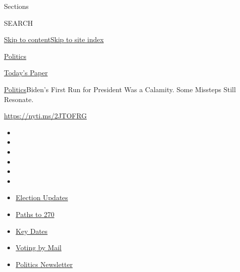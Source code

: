 Sections

SEARCH

\protect\hyperlink{site-content}{Skip to
content}\protect\hyperlink{site-index}{Skip to site index}

\href{https://www.nytimes3xbfgragh.onion/section/politics}{Politics}

\href{https://myaccount.nytimes3xbfgragh.onion/auth/login?response_type=cookie\&client_id=vi}{}

\href{https://www.nytimes3xbfgragh.onion/section/todayspaper}{Today's
Paper}

\href{/section/politics}{Politics}\textbar{}Biden's First Run for
President Was a Calamity. Some Missteps Still Resonate.

\url{https://nyti.ms/2JTOFRG}

\begin{itemize}
\item
\item
\item
\item
\item
\item
\end{itemize}

\begin{itemize}
\item
  \href{https://www.nytimes3xbfgragh.onion/live/2020/09/11/us/trump-vs-biden?action=click\&pgtype=Article\&state=default\&region=TOP_BANNER\&context=storylines_menu}{Election
  Updates}
\item
  \href{https://www.nytimes3xbfgragh.onion/interactive/2020/us/elections/election-states-biden-trump.html?action=click\&pgtype=Article\&state=default\&region=TOP_BANNER\&context=storylines_menu}{Paths
  to 270}
\item
  \href{https://www.nytimes3xbfgragh.onion/interactive/2019/us/elections/2020-presidential-election-calendar.html?action=click\&pgtype=Article\&state=default\&region=TOP_BANNER\&context=storylines_menu}{Key
  Dates}
\item
  \href{https://www.nytimes3xbfgragh.onion/interactive/2020/08/31/us/politics/vote-by-mail-deadlines.html?action=click\&pgtype=Article\&state=default\&region=TOP_BANNER\&context=storylines_menu}{Voting
  by Mail}
\item
  \href{https://www.nytimes3xbfgragh.onion/newsletters/politics?action=click\&pgtype=Article\&state=default\&region=TOP_BANNER\&context=storylines_menu}{Politics
  Newsletter}
\end{itemize}

